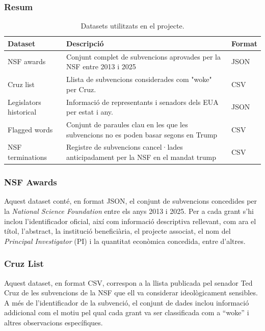 \documentclass[12pt, a4paper]{article}
\begin{document}
\subsubsection{Resum}
\begin{table}[h!]
\centering
\small
\begin{tabular}{@{}p{3.4cm}p{6.6cm}p{3.0cm}@{}}
\toprule
\textbf{Dataset} & \textbf{Descripció} & \textbf{Format}\\
\midrule
NSF awards &
Conjunt complet de subvencions aprovades per la NSF entre 2013 i 2025 &
JSON \\

Cruz list &
Llista de subvencions considerades com "woke" per Cruz. &
CSV  \\

Legislators historical &
Informació de representants i senadors dels EUA per estat i any.
&
JSON \\

Flagged words &
Conjunt de paraules clau en les que les subvencions no es poden basar segons en Trump &
CSV  \\

NSF terminations &
Registre de subvencions cancel·lades anticipadament per la NSF en el mandat trump &
CSV\\
\bottomrule
\end{tabular}
\caption{Datasets utilitzats en el projecte.}
\end{table}

\subsubsection{NSF Awards}
Aquest dataset conté, en format JSON, el conjunt de subvencions concedides per la \textit{National Science Foundation} entre els anys 2013 i 2025. Per a cada grant s’hi inclou l’identificador oficial, així com informació descriptiva rellevant, com ara el títol, l’abstract, la institució beneficiària, el projecte associat, el nom del \textit{Principal Investigator} (PI) i la quantitat econòmica concedida, entre d’altres.

\subsubsection{Cruz List}
Aquest dataset, en format CSV, correspon a la llista publicada pel senador Ted Cruz de les subvencions de la NSF que ell va considerar ideològicament sensibles. A més de l’identificador de la subvenció, el conjunt de dades inclou informació addicional com el motiu pel qual cada grant va ser classificada com a “woke” i altres observacions específiques.
\end{document}
